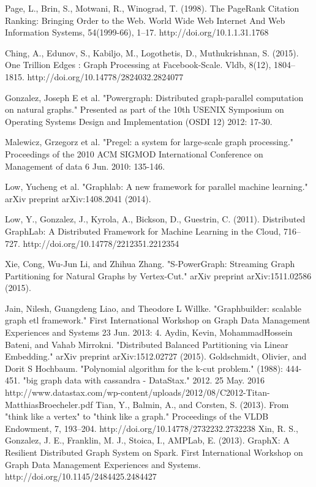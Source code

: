 \documentclass[12pt]{article}
\begin{document}
\begin{thebibliography}{1}

   Page, L., Brin, S., Motwani, R.,  Winograd, T. (1998). The PageRank Citation Ranking: Bringing Order to the Web. World Wide Web Internet And Web Information Systems, 54(1999-66), 1–17. http://doi.org/10.1.1.31.1768
  
   Ching, A., Edunov, S., Kabiljo, M., Logothetis, D.,  Muthukrishnan, S. (2015). One Trillion Edges : Graph Processing at Facebook-Scale. Vldb, 8(12), 1804–1815. http://doi.org/10.14778/2824032.2824077
  
   Gonzalez, Joseph E et al. "Powergraph: Distributed graph-parallel computation on natural graphs." Presented as part of the 10th USENIX Symposium on Operating Systems Design and Implementation (OSDI 12) 2012: 17-30.

    Malewicz, Grzegorz et al. "Pregel: a system for large-scale graph processing." Proceedings of the 2010 ACM SIGMOD International Conference on Management of data 6 Jun. 2010: 135-146.

   Low, Yucheng et al. "Graphlab: A new framework for parallel machine learning." arXiv preprint arXiv:1408.2041 (2014).
  
   Low, Y., Gonzalez, J., Kyrola, A., Bickson, D.,  Guestrin, C. (2011). Distributed GraphLab: A Distributed Framework for Machine Learning in the Cloud, 716–727. http://doi.org/10.14778/2212351.2212354
  
   Xie, Cong, Wu-Jun Li, and Zhihua Zhang. "S-PowerGraph: Streaming Graph Partitioning for Natural Graphs by Vertex-Cut." arXiv preprint arXiv:1511.02586 (2015).
  
   Jain, Nilesh, Guangdeng Liao, and Theodore L Willke. "Graphbuilder: scalable graph etl framework." First International Workshop on Graph Data Management Experiences and Systems 23 Jun. 2013: 4.
   Aydin, Kevin, MohammadHossein Bateni, and Vahab Mirrokni. "Distributed Balanced Partitioning via Linear Embedding." arXiv preprint arXiv:1512.02727 (2015).
   Goldschmidt, Olivier, and Dorit S Hochbaum. "Polynomial algorithm for the k-cut problem." (1988): 444-451.
   "big graph data with cassandra - DataStax." 2012. 25 May. 2016 http://www.datastax.com/wp-content/uploads/2012/08/C2012-Titan-MatthiasBroecheler.pdf
   Tian, Y., Balmin, A., and Corsten, S. (2013). From "think like a vertex" to "think like a graph." Proceedings of the VLDB Endowment, 7, 193–204. http://doi.org/10.14778/2732232.2732238
   Xin, R. S., Gonzalez, J. E., Franklin, M. J., Stoica, I.,  AMPLab, E. (2013). GraphX: A Resilient Distributed Graph System on Spark. First International Workshop on Graph Data Management Experiences and Systems. http://doi.org/10.1145/2484425.2484427

  
  
\end{thebibliography}
\end{document}
